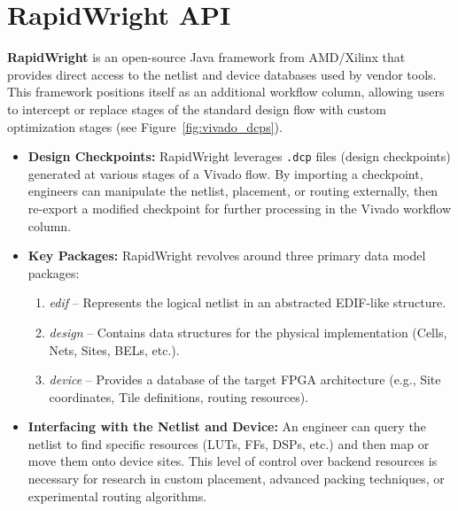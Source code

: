 
\section{RapidWright API}
\label{sec:rapidwright_api}

\textbf{RapidWright} is an open-source Java framework from AMD/Xilinx that provides direct access to the netlist and device databases used by vendor tools. 
This framework positions itself as an additional workflow column, allowing users to intercept or replace stages of the standard design flow with custom optimization stages (see Figure~\ref{fig:vivado_dcps}).

\begin{itemize}
\item \textbf{Design Checkpoints:} 
    RapidWright leverages \texttt{.dcp} files (design checkpoints) generated at various stages of a Vivado flow. 
    By importing a checkpoint, engineers can manipulate the netlist, placement, or routing externally, then re-export a modified checkpoint for further processing in the Vivado workflow column.

\item \textbf{Key Packages:} 
    RapidWright revolves around three primary data model packages:
    \begin{enumerate}
    \item \emph{edif} -- Represents the logical netlist in an abstracted EDIF-like structure.
    \item \emph{design} -- Contains data structures for the physical implementation (Cells, Nets, Sites, BELs, etc.).
    \item \emph{device} -- Provides a database of the target FPGA architecture (e.g., Site coordinates, Tile definitions, routing resources).
    \end{enumerate}

\item \textbf{Interfacing with the Netlist and Device:} 
    An engineer can query the netlist to find specific resources (LUTs, FFs, DSPs, etc.) and then map or move them onto device sites. 
    This level of control over backend resources is necessary for research in custom placement, advanced packing techniques, or experimental routing algorithms.
\end{itemize}

